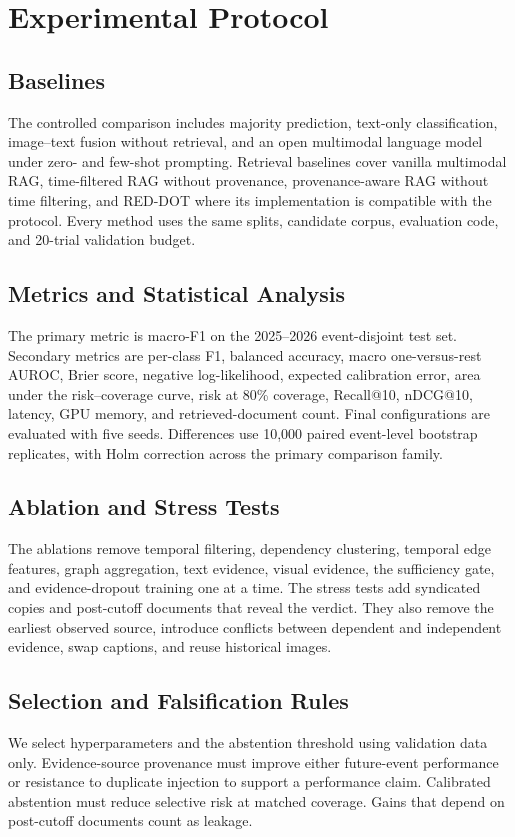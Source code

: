 \section{Experimental Protocol}

\subsection{Baselines}

The controlled comparison includes majority prediction, text-only classification, image--text fusion without retrieval, and an open multimodal language model under zero- and few-shot prompting. Retrieval baselines cover vanilla multimodal RAG, time-filtered RAG without provenance, provenance-aware RAG without time filtering, and RED-DOT where its implementation is compatible with the protocol. Every method uses the same splits, candidate corpus, evaluation code, and 20-trial validation budget.

\subsection{Metrics and Statistical Analysis}

The primary metric is macro-F1 on the 2025--2026 event-disjoint test set. Secondary metrics are per-class F1, balanced accuracy, macro one-versus-rest AUROC, Brier score, negative log-likelihood, expected calibration error, area under the risk--coverage curve, risk at 80\% coverage, Recall@10, nDCG@10, latency, GPU memory, and retrieved-document count. Final configurations are evaluated with five seeds. Differences use 10,000 paired event-level bootstrap replicates, with Holm correction across the primary comparison family.

\subsection{Ablation and Stress Tests}

The ablations remove temporal filtering, dependency clustering, temporal edge features, graph aggregation, text evidence, visual evidence, the sufficiency gate, and evidence-dropout training one at a time. The stress tests add syndicated copies and post-cutoff documents that reveal the verdict. They also remove the earliest observed source, introduce conflicts between dependent and independent evidence, swap captions, and reuse historical images.

\subsection{Selection and Falsification Rules}

We select hyperparameters and the abstention threshold using validation data only. Evidence-source provenance must improve either future-event performance or resistance to duplicate injection to support a performance claim. Calibrated abstention must reduce selective risk at matched coverage. Gains that depend on post-cutoff documents count as leakage.

